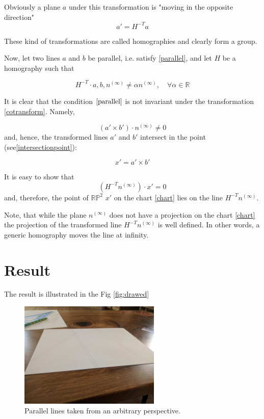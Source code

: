 \documentclass[a4paper,10pt]{article}
\begin{document}
Obviously a plane $a$ under this transformation  is "moving in the opposite direction"
\begin{equation}
a'=H^{-T}a\label{cotransform}
\end{equation}

These kind of transformations are called homographies and clearly form a group. 

Now, let two lines $a$ and $b$ be parallel, i.e. satisfy \eqref{parallel},  and let $H$ be a homography such that

\begin{equation}
H^{-T} \cdot a,b,n^{(\infty)}  \neq \alpha n^{(\infty)} , \quad \forall \alpha \in \mathbb{R}
\end{equation}

 It is clear that the condition $\eqref{parallel}$ is not invariant under the transformation \eqref{cotransform}. Namely,

\begin{equation}
(a'\times b')\cdot  n^{(\infty)} \neq 0
\end{equation} 
 and, hence, the transformed lines $a'$ and $b'$ intersect in the point (see\eqref{intersectionpoint}):

\begin{equation}
x' = a' \times b'
\end{equation}

It is easy to show that 
\begin{equation}
(H^{-T}n^{(\infty)}) \cdot x'  = 0
\end{equation}
and, therefore, the point of $\mathbb{RP}^2$ $x'$ on the chart \eqref{chart} lies on the line $H^{-T}n^{(\infty)}$. 

Note, that while the plane $n^{(\infty)}$ does not have a projection on the chart \eqref{chart} the projection of the  transformed line $H^{-T}n^{(\infty)}$ is well defined. In other words, a generic homography moves the line at infinity.


\section{Result}

The result is illustrated in the Fig \ref{fig:drawed}

\begin{figure}[h]
\centering
 \includegraphics[width=0.6\textwidth]{../../images/parallel.jpg}
 \caption{Parallel lines taken from an arbitrary perspective. }
 \label{fig:3dcart}
\end{figure}
\end{document}
